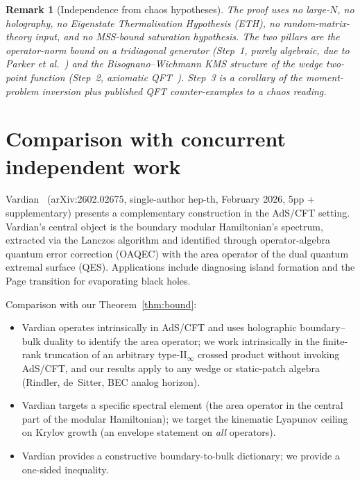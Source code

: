 \documentclass[12pt,a4paper]{article}
\newtheorem{remark}{Remark}
\begin{document}
\begin{remark}[Independence from chaos hypotheses]
The proof uses no large-$N$, no holography, no Eigenstate Thermalisation
Hypothesis (ETH), no random-matrix-theory input, and no MSS-bound
saturation hypothesis. The two pillars are the operator-norm bound
on a tridiagonal generator (Step~1, purely algebraic, due to
Parker et al.~\cite{Parker2019}) and the Bisognano--Wichmann
KMS structure of the wedge two-point function (Step~2, axiomatic
QFT~\cite{BisognanoWichmann1976}). Step~3 is a corollary of the
moment-problem inversion plus published QFT counter-examples to a
chaos reading.
\end{remark}

\section{Comparison with concurrent independent work}
\label{sec:vardian}

Vardian~\cite{Vardian2026} (arXiv:2602.02675, single-author hep-th,
February 2026, 5pp + supplementary) presents a complementary
construction in the AdS/CFT setting. Vardian's central object is
the boundary modular Hamiltonian's spectrum, extracted via the
Lanczos algorithm and identified through operator-algebra quantum
error correction (OAQEC) with the area operator of the dual quantum
extremal surface (QES). Applications include diagnosing island
formation and the Page transition for evaporating black holes.

Comparison with our Theorem~\ref{thm:bound}:

\begin{itemize}
\item Vardian operates intrinsically in AdS/CFT and uses
holographic boundary--bulk duality to identify the area operator;
we work intrinsically in the finite-rank truncation of an arbitrary
type-II$_\infty$ crossed product without invoking AdS/CFT, and our
results apply to any wedge or static-patch algebra (Rindler,
de~Sitter, BEC analog horizon).
\item Vardian targets a specific spectral element (the area operator
in the central part of the modular Hamiltonian); we target the
kinematic Lyapunov ceiling on Krylov growth (an envelope statement
on \emph{all} operators).
\item Vardian provides a constructive boundary-to-bulk dictionary;
we provide a one-sided inequality.
\end{itemize}
\end{document}
